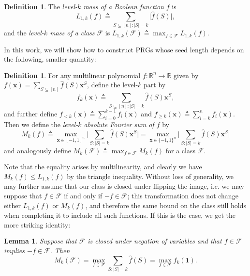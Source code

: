 \documentclass[10pt,a4paper]{article}
\newtheorem{lemma}[theorem]{Lemma}
\theoremstyle{definition}
\newtheorem{definition}[theorem]{Definition}
\begin{document}
\begin{definition}
The \emph{level-$k$ mass of a Boolean function} $f$ is 
\begin{equation*}
    L_{1,k}(f)\triangleq \sum_{S\subseteq [n]:\vert S\vert=k} \vert \hat{f}(S)\vert,
\end{equation*}
and the \emph{level-$k$ mass of a class $\mathcal{F}$} is
$L_{1,k}(\mathcal{F})\triangleq \max_{f\in \mathcal{F}} L_{1,k}(f)$.
\end{definition}

In this work, we will show how to construct PRGs whose seed length depends on the following, smaller quantity:

\begin{definition}
\label{def:mk}
For any multilinear polynomial $f:\mathbb{R}^n\to \mathbb{R}$ given by $f(\mathbf{x})=\sum_{S\subseteq [n]} \hat{f}(S)\mathbf{x}^S$, define the level-$k$ part by
\begin{equation*}
    f_{k}(\mathbf{x})\triangleq\sum_{S\subseteq [n]:\vert S\vert=k} \hat{f}(S)\mathbf{x}^S,
\end{equation*}
and further define $f_{<k}(\mathbf{x})\triangleq \sum_{i=0}^{k-1} f_i(\mathbf{x})$ and $f_{\geq k}(\mathbf{x})\triangleq \sum_{i=k}^{n} f_i(\mathbf{x})$. 
Then we define the \emph{level-$k$ absolute Fourier sum of $f$} by
\begin{equation*}
    M_k(f)\triangleq \max_{\mathbf{x}\in [-1,1]^n}\bigg\vert \sum_{S:\vert S\vert=k} \hat{f}(S)\mathbf{x}^S\bigg\vert =  \max_{\mathbf{x}\in \{-1,1\}^n}\bigg\vert \sum_{S:\vert S\vert=k} \hat{f}(S)\mathbf{x}^S\bigg\vert
\end{equation*}
and analogously define $M_k(\mathcal{F})\triangleq \max_{f\in \mathcal{F}} M_k(f)$ for a class $\mathcal{F}$.
\end{definition}
Note that the equality arises by multilinearity, and clearly we have $M_k(f)\leq L_{1,k}(f)$ by the triangle inequality. Without loss of generality, we may further assume that our class is closed under flipping the image, i.e. we may suppose that $f\in \mathcal{F}$ if and only if $-f\in \mathcal{F}$; this transformation does not change either $L_{1,k}(f)$ or $M_k(f)$, and therefore the same bound on the class still holds when completing it to include all such functions. If this is the case, we get the more striking identity:

\begin{lemma}
\label{lem:unsigned}
Suppose that $\mathcal{F}$ is closed under negation of variables and that $f\in \mathcal{F}$ implies $-f\in \mathcal{F}$. Then
\begin{equation*}
    M_k(\mathcal{F})=\max_{f\in \mathcal{F}} \sum_{S:\vert S\vert = k} \hat{f}(S) = \max_{f \in  \mathcal{F} } f_k \left( \mathbf{1} \right) .
\end{equation*}
\end{lemma}
\end{document}
